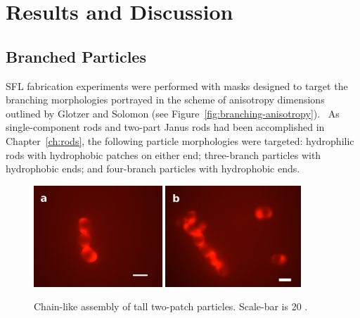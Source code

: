 \section{Results and Discussion}

\subsection{Branched Particles}


SFL fabrication experiments were performed with masks designed to target the branching morphologies
portrayed in the scheme of anisotropy dimensions outlined by Glotzer and Solomon
(see Figure~\ref{fig:branching-anisotropy}).~\cite{glotzer-solomon}  As single-component rods and 
two-part Janus rods had been accomplished in Chapter~\ref{ch:rods}, the following particle 
morphologies were targeted: hydrophilic rods with hydrophobic patches on either end; three-branch particles
with hydrophobic ends; and four-branch particles with hydrophobic ends.


\begin{figure}[h]
\begin{center}
\includegraphics[height=1.5in]{figures/complex-shapes/twopatch-3chain-sb20.png} \includegraphics[height=1.5in]{figures/complex-shapes/twopatch-flchain-sb20.png}
\end{center}
\caption{Chain-like assembly of tall two-patch particles. Scale-bar is 20 \microns.}
\label{fig:tall-2patch}
\end{figure}

